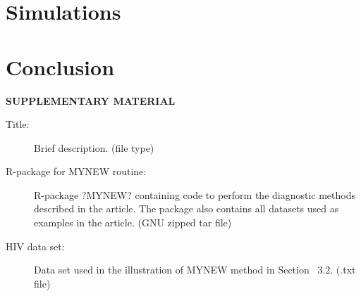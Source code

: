 \documentclass[12pt]{article}\usepackage[]{graphicx}\usepackage[]{color}
\begin{document}
\section{Simulations}
\label{sec:simulations}

\section{Conclusion}
\label{sec:conc}


\newpage
\begin{center}
{\large\bf SUPPLEMENTARY MATERIAL}
\end{center}

\begin{description}

\item[Title:] Brief description. (file type)

\item[R-package for  MYNEW routine:] R-package ?MYNEW? containing code to perform the diagnostic methods described in the article. The package also contains all datasets used as examples in the article. (GNU zipped tar file)

\item[HIV data set:] Data set used in the illustration of MYNEW method in Section~ 3.2. (.txt file)

\end{description}



\end{document}
